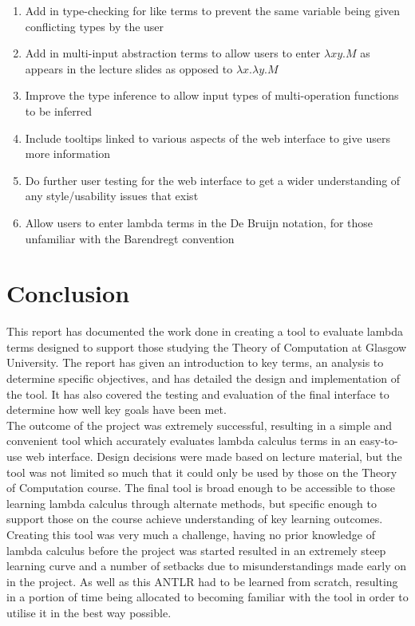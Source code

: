 \documentclass[a4paper,11pt]{report}
\begin{document}
\begin{enumerate}
	\item Add in type-checking for like terms to prevent the same variable being given conflicting types by the user
	\item Add in multi-input abstraction terms to allow users to enter $\lambda xy.M$ as appears in the lecture slides \cite{Gay2019} as opposed to $\lambda x.\lambda y.M$
	\item Improve the type inference to allow input types of multi-operation functions to be inferred
	\item Include tooltips linked to various aspects of the web interface to give users more information
	\item Do further user testing for the web interface to get a wider understanding of any style/usability issues that exist 
	\item Allow users to enter lambda terms in the De Bruijn notation, for those unfamiliar with the Barendregt convention
\end{enumerate}

\chapter{Conclusion}
This report has documented the work done in creating a tool to evaluate lambda terms designed to support those studying the Theory of Computation at Glasgow University. The report has given an introduction to key terms, an analysis to determine specific objectives, and has detailed the design and implementation of the tool. It has also covered the testing and evaluation of the final interface to determine how well key goals have been met.\\

The outcome of the project was extremely successful, resulting in a simple and convenient tool which accurately evaluates lambda calculus terms in an easy-to-use web interface. Design decisions were made based on lecture material, but the tool was not limited so much that it could only be used by those on the Theory of Computation course. The final tool is broad enough to be accessible to those learning lambda calculus through alternate methods, but specific enough to support those on the course achieve understanding of key learning outcomes.\\

Creating this tool was very much a challenge, having no prior knowledge of lambda calculus before the project was started resulted in an extremely steep learning curve and a number of setbacks due to misunderstandings made early on in the project. As well as this ANTLR had to be learned from scratch, resulting in a portion of time being allocated to becoming familiar with the tool in order to utilise it in the best way possible.\\
\end{document}
